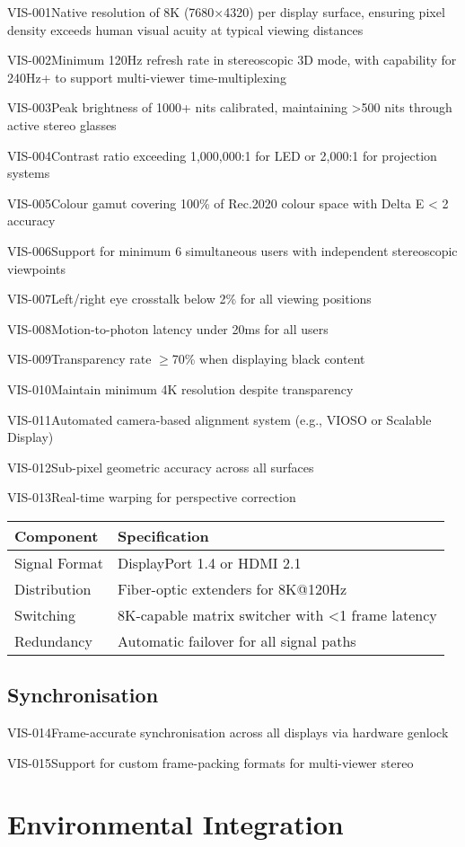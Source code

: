 \begin{requirement}{VIS-001}{Native resolution of 8K (7680×4320) per display surface, ensuring pixel density exceeds human visual acuity at typical viewing distances}
\begin{requirement}{VIS-002}{Minimum 120Hz refresh rate in stereoscopic 3D mode, with capability for 240Hz+ to support multi-viewer time-multiplexing}
\begin{requirement}{VIS-003}{Peak brightness of 1000+ nits calibrated, maintaining >500 nits through active stereo glasses}
\begin{requirement}{VIS-004}{Contrast ratio exceeding 1,000,000:1 for LED or 2,000:1 for projection systems}
\begin{requirement}{VIS-005}{Colour gamut covering 100\% of Rec.2020 colour space with Delta E < 2 accuracy}
\begin{requirement}{VIS-006}{Support for minimum 6 simultaneous users with independent stereoscopic viewpoints}
\begin{requirement}{VIS-007}{Left/right eye crosstalk below 2\% for all viewing positions}
\begin{requirement}{VIS-008}{Motion-to-photon latency under 20ms for all users}
\begin{requirement}{VIS-009}{Transparency rate $\ge$70\% when displaying black content}
\begin{requirement}{VIS-010}{Maintain minimum 4K resolution despite transparency}
\begin{requirement}{VIS-011}{Automated camera-based alignment system (e.g., VIOSO or Scalable Display)}
\begin{requirement}{VIS-012}{Sub-pixel geometric accuracy across all surfaces}
\begin{requirement}{VIS-013}{Real-time warping for perspective correction}
\begin{table}[H]
\centering
\begin{tabularx}{\textwidth}{@{}lX@{}}
\toprule
\textbf{Component} & \textbf{Specification} \\
\midrule
Signal Format & DisplayPort 1.4 or HDMI 2.1 \\
Distribution & Fiber-optic extenders for 8K@120Hz \\
Switching & 8K-capable matrix switcher with <1 frame latency \\
Redundancy & Automatic failover for all signal paths \\
\bottomrule
\end{tabularx}
\end{table}

\subsection{Synchronisation}

\begin{requirement}{VIS-014}{Frame-accurate synchronisation across all displays via hardware genlock}

\begin{requirement}{VIS-015}{Support for custom frame-packing formats for multi-viewer stereo}

\section{Environmental Integration}


\end{requirement}
\end{requirement}
\end{requirement}
\end{requirement}
\end{requirement}
\end{requirement}
\end{requirement}
\end{requirement}
\end{requirement}
\end{requirement}
\end{requirement}
\end{requirement}
\end{requirement}
\end{requirement}
\end{requirement}
